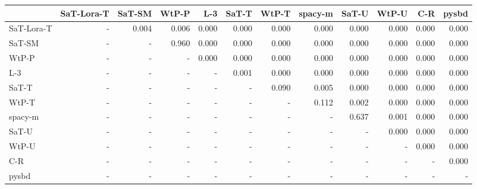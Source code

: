 \begin{tabular}{lrrrrrrrrrrr}
\toprule
 & SaT-Lora-T & SaT-SM & WtP-P & L-3 & SaT-T & WtP-T & spacy-m & SaT-U & WtP-U & C-R & pysbd \\
\midrule
SaT-Lora-T & - & 0.004 & 0.006 & 0.000 & 0.000 & 0.000 & 0.000 & 0.000 & 0.000 & 0.000 & 0.000 \\
SaT-SM & - & - & 0.960 & 0.000 & 0.000 & 0.000 & 0.000 & 0.000 & 0.000 & 0.000 & 0.000 \\
WtP-P & - & - & - & 0.000 & 0.000 & 0.000 & 0.000 & 0.000 & 0.000 & 0.000 & 0.000 \\
L-3 & - & - & - & - & 0.001 & 0.000 & 0.000 & 0.000 & 0.000 & 0.000 & 0.000 \\
SaT-T & - & - & - & - & - & 0.090 & 0.005 & 0.000 & 0.000 & 0.000 & 0.000 \\
WtP-T & - & - & - & - & - & - & 0.112 & 0.002 & 0.000 & 0.000 & 0.000 \\
spacy-m & - & - & - & - & - & - & - & 0.637 & 0.001 & 0.000 & 0.000 \\
SaT-U & - & - & - & - & - & - & - & - & 0.000 & 0.000 & 0.000 \\
WtP-U & - & - & - & - & - & - & - & - & - & 0.000 & 0.000 \\
C-R & - & - & - & - & - & - & - & - & - & - & 0.000 \\
pysbd & - & - & - & - & - & - & - & - & - & - & - \\
\bottomrule
\end{tabular}

